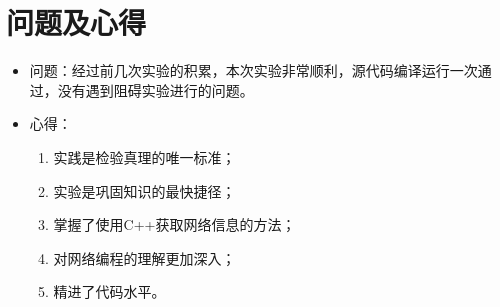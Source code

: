 \documentclass[a4paper]{ctexrep}
\begin{document}
\section{问题及心得}
	\begin{itemize}
		\item 问题：经过前几次实验的积累，本次实验非常顺利，源代码编译运行一次通过，没有遇到阻碍实验进行的问题。
		\item 心得：\begin{enumerate}
			\item 实践是检验真理的唯一标准；
			\item 实验是巩固知识的最快捷径；
			\item 掌握了使用C++获取网络信息的方法；
			\item 对网络编程的理解更加深入；
			\item 精进了代码水平。
		\end{enumerate}
	\end{itemize}
\end{document}
